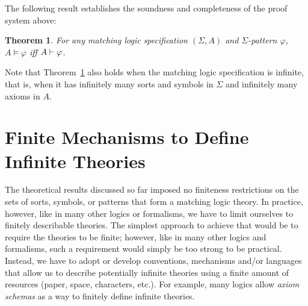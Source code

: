 \documentclass[UTF8,11pt]{article}
\newcounter{thmcounter}
\theoremstyle{plain}
\newtheorem{theorem}    [thmcounter]{Theorem}
\theoremstyle{definition}
\theoremstyle{remark}
\begin{document}
The following result establishes the soundness and completeness
of the proof system above:

\begin{theorem}\cite{rosu-2017-lmcs}
\label{thm:completeness}
For any matching logic specification $(\Sigma,A)$ and $\Sigma$-pattern
$\varphi$, $A \models \varphi$ iff ${A}\vdash{\varphi}$.
\end{theorem}

Note that Theorem~\ref{thm:completeness} also holds when the matching logic
specification is infinite, that is, when it has infinitely many sorts and
symbols in $\Sigma$ and infinitely many axioms in $A$.


\section{Finite Mechanisms to Define Infinite Theories}
\label{sec:finite-mechanisms}

The theoretical results discussed so far imposed no finiteness
restrictions on the sets of sorts, symbols, or patterns that form a matching
logic theory.
In practice, however, like in many other logics or formalisms, we have to
limit ourselves to finitely describable theories.
The simplest approach to achieve that would be to require the theories to be
finite; however, like in many other logics and formalisms, such a requirement
would simply be too strong to be practical.
Instead, we have to adopt or develop conventions, mechanisms and/or languages
that allow us to describe potentially infinite theories using a finite amount
of resources (paper, space, characters, etc.).
For example, many logics allow \emph{axiom schemas} as a way to finitely
define infinite theories.
\end{document}
